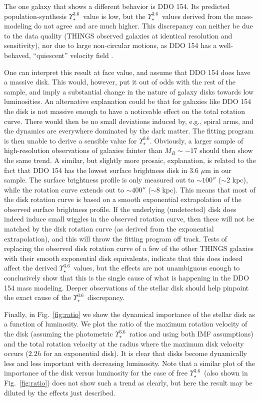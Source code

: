 \documentclass[usenatbib,usegraphicx,apjfonts,floatfix]{emulateapj}
\newcommand{\Ups}{\ensuremath{\Upsilon_{\star}^{3.6}}}
\begin{document}
The one galaxy that shows a different behavior is DDO 154.  Its
predicted population-synthesis \Ups\ value is low, but
the \Ups\ values derived from the mass-modeling do not agree and are
much higher.  This discrepancy can neither be due to the data quality
(THINGS observed galaxies at identical resolution and sensitivity),
nor due to large non-circular motions, as DDO 154 has a well-behaved,
``quiescent'' velocity field \citep{clemens2007}.

One can interpret this result at face value, and assume that DDO 154
does have a massive disk. This would, however, put it out of
odds with the rest of the sample, and imply a substantial change in
the nature of galaxy disks towards low luminosities.  An alternative
explanation could be that for galaxies like DDO 154 the disk is not
massive enough to have a noticeable effect on the total rotation
curve.  There would then be no small deviations induced by, e.g.,
spiral arms, and the dynamics are everywhere dominated by the dark
matter.  The fitting program is then unable to derive a sensible value
for \Ups.  Obviously, a larger sample of high-resolution observations
of galaxies fainter than $M_B \sim -17$ should then show the same
trend.  A similar, but slightly more prosaic, explanation, is related
to the fact that DDO 154 has the lowest surface brightness disk in 3.6
$\mu$m in our sample. The surface brightness profile is only measured
out to $\sim 100''$ ($\sim 2$ kpc), while the rotation curve extends
out to $\sim 400''$ ($\sim 8$ kpc). This means that most of the disk
rotation curve is based on a smooth exponential extrapolation of the
observed surface brightness profile. If the underlying (undetected)
disk does indeed induce small wiggles in the observed rotation curve,
then these will not be matched by the disk rotation curve (as derived
from the exponential extrapolation), and this will throw the fitting
program off track. Tests of replacing the observed disk rotation curve
of a few of the other THINGS galaxies with their smooth exponential
disk equivalents, indicate that this does indeed affect the derived
\Ups\ values, but the effects are not unambiguous enough to
conclusively show that this is the single cause of what is happening
in the DDO 154 mass modeling. Deeper observations of the stellar disk
should help pinpoint the exact cause of the \Ups\ discrepancy.


Finally, in Fig.~\ref{fig:ratio} we show the dynamical importance of the
stellar disk as a function of luminosity.  We plot the ratio of the
maximum rotation velocity of the disk (assuming the photometric \Ups\
ratios and using both IMF assumptions) and the total rotation velocity at the radius where the
maximum disk velocity occurs ($2.2h$ for an exponential disk).  It is
clear that disks become dynamically less and less important with
decreasing luminosity. Note that a similar plot of the importance of
the disk versus luminosity for the case of free \Ups\ (also shown in
Fig.~\ref{fig:ratio}) does not show such a trend as clearly, but here
the result may be diluted by the effects just described.
\end{document}
